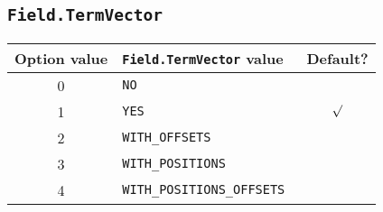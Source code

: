 \subsection{\tt Field.TermVector}
\begin{table}[h]
\begin{center}
\label{tableVector}
\begin{tabular}{|c|l|c|}
\hline
\bfseries Option value & {\bfseries \tt Field.TermVector} value&Default?\bfseries \\ \hline \hline
        0& \tt NO&  \\\hline
        1& \tt YES & $\surd$\\\hline
        2& \tt WITH\_OFFSETS & \\\hline
        3& \tt WITH\_POSITIONS & \\\hline
        4& \tt WITH\_POSITIONS\_OFFSETS & \\\hline
\end{tabular}
\end{center}
\end{table}
